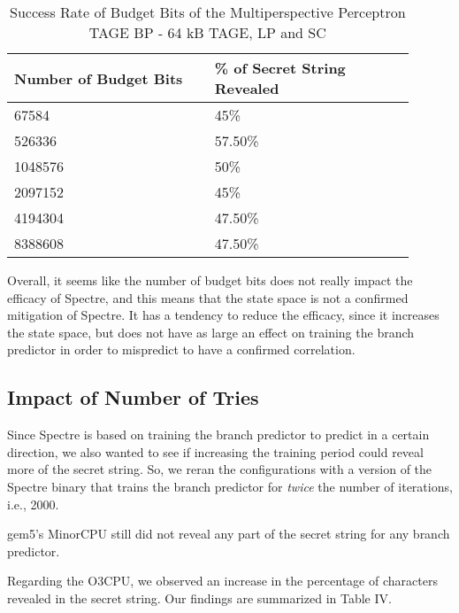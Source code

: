 \documentclass[twocolumn,showpacs,%
  nofootinbib,aps,superscriptaddress,%
  eqsecnum,prd,notitlepage,showkeys,10pt]{revtex4-1}
\begin{document}
\begin{table}
\centering
\caption{Success Rate of Budget Bits of the Multiperspective Perceptron TAGE BP - 64 kB TAGE, LP and SC}
\small
\begin{tabular}{|p{0.45\linewidth}|p{0.45\linewidth}|}
\hline
Number of Budget Bits & \% of Secret String Revealed \\
\hline
67584 & 45\% \\
526336 & 57.50\% \\
1048576 & 50\% \\
2097152 & 45\% \\
4194304 & 47.50\% \\
8388608 & 47.50\% \\
\hline
\end{tabular}
\end{table}

Overall, it seems like the number of budget bits does not really impact the efficacy of Spectre, and this means that the state space is not a confirmed mitigation of Spectre. It has a tendency to reduce the efficacy, since it increases the state space, but does not have as large an effect on training the branch predictor in order to mispredict to have a confirmed correlation.  

\subsection{Impact of Number of Tries}

Since Spectre is based on training the branch predictor to predict in a certain direction, we also wanted to see if increasing the training period could reveal more of the secret string. So, we reran the configurations with a version of the Spectre binary that trains the branch predictor for \textit{twice} the number of iterations, i.e., 2000.

gem5's MinorCPU still did not reveal any part of the secret string for any branch predictor.

Regarding the O3CPU, we observed an increase in the percentage of characters revealed in the secret string. Our findings are summarized in Table IV.
\end{document}
